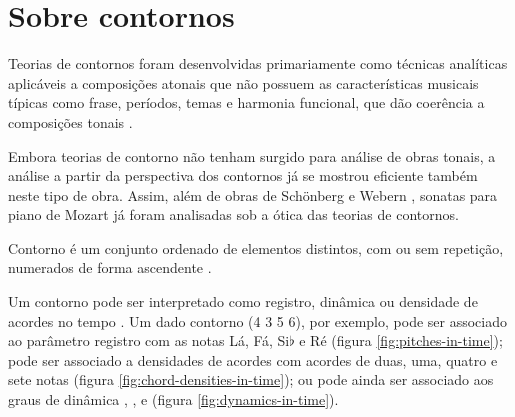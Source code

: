 \chapter{Sobre contornos}
\label{cha:sobre-contornos}





Teorias de contornos foram desenvolvidas primariamente como técnicas
analíticas aplicáveis a composições atonais que não possuem as
características musicais típicas como frase, períodos, temas e
harmonia funcional, que dão coerência a composições tonais
\cite[p. 1]{beard03:contour}.

Embora teorias de contorno não tenham surgido para análise de obras
tonais, a análise a partir da perspectiva dos contornos já se mostrou
eficiente também neste tipo de obra. Assim, além de obras de Schönberg
\cite{friedmann85:methodology} e Webern \cite{clifford95:contour},
sonatas para piano de Mozart \cite{beard03:contour} já foram
analisadas sob a ótica das teorias de contornos.

Contorno é um conjunto ordenado de elementos distintos, com ou sem
repetição, numerados de forma ascendente
\cite[p. 206]{morris93:directions}.

Um contorno pode ser interpretado como registro, dinâmica ou densidade
de acordes no tempo \cite[p. 206]{morris93:directions}
\cite[p. 22]{clifford95:contour}. Um dado contorno (4 3 5 6), por
exemplo, pode ser associado ao parâmetro registro com as notas Lá, Fá,
Si$\flat$ e Ré (figura \ref{fig:pitches-in-time}); pode ser associado
a densidades de acordes com acordes de duas, uma, quatro e sete notas
(figura \ref{fig:chord-densities-in-time}); ou pode ainda ser
associado aos graus de dinâmica , ,  e
 (figura \ref{fig:dynamics-in-time}).

